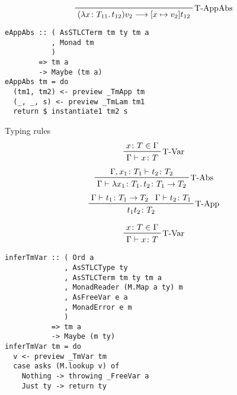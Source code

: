 \documentclass{beamer}
\begin{document}
\begin{frame}[fragile]
\begin{frame}[fragile]
  \begin{displaymath}  
    \prftree[r]{T-AppAbs}
    {(\lambda x \colon T_{11} \ldotp t_{12})v_2 \longrightarrow [x \mapsto v_2]t_{12}}
  \end{displaymath}  
  \begin{verbatim}
eAppAbs :: ( AsSTLCTerm tm ty tm a
           , Monad tm 
           )
        => tm a
        -> Maybe (tm a)
eAppAbs tm = do
  (tm1, tm2) <- preview _TmApp tm
  (_, _, s) <- preview _TmLam tm1
  return $ instantiate1 tm2 s
  \end{verbatim}  
\end{frame}

\begin{frame}
  Typing rules
  \begin{displaymath}  
    \prftree[r]{T-Var}
    {x \colon T \in \Gamma}
    {\Gamma \vdash x \colon T}
  \end{displaymath}  
  \begin{displaymath}  
    \prftree[r]{T-Abs}
    {\Gamma, x_1 \colon T_1 \vdash t_2 \colon T_2}
    {\Gamma \vdash \lambda x_1 \colon T_1 \ldotp t_2 \colon T_1 \rightarrow T_2}
  \end{displaymath}  
  \begin{displaymath}  
    \prftree[r]{T-App}
    {\Gamma \vdash t_1 \colon T_1 \rightarrow T_2}
    {\Gamma \vdash t_2 \colon T_1}
    {t_1 t_2 \colon T_2}
  \end{displaymath}  
\end{frame}

\begin{frame}[fragile]
  \begin{displaymath}  
    \prftree[r]{T-Var}
    {x \colon T \in \Gamma}
    {\Gamma \vdash x \colon T}
  \end{displaymath}  
  \begin{verbatim}
inferTmVar :: ( Ord a
              , AsSTLCType ty
              , AsSTLCTerm tm ty tm a
              , MonadReader (M.Map a ty) m
              , AsFreeVar e a
              , MonadError e m
              )
           => tm a
           -> Maybe (m ty)
inferTmVar tm = do
  v <- preview _TmVar tm
  case asks (M.lookup v) of
    Nothing -> throwing _FreeVar a 
    Just ty -> return ty
  \end{verbatim}  
\end{frame}


\end{frame}
\end{document}
